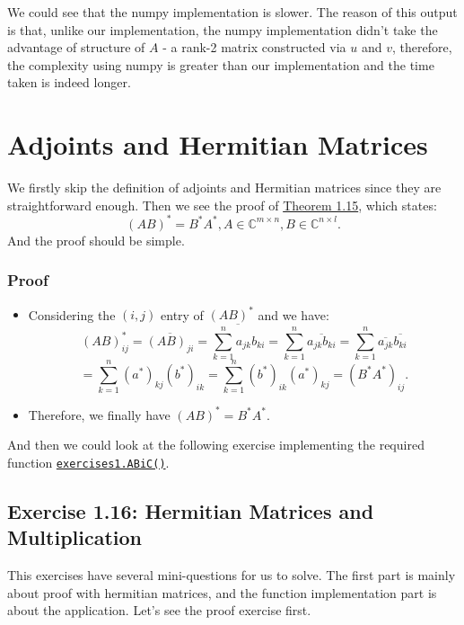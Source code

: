 \noindent We could see that the numpy implementation is slower. The reason of this output is that, unlike our implementation, the numpy implementation didn't take the advantage of structure of \(A\) - a rank-2 matrix constructed via \(u\) and \(v\), therefore, the complexity using numpy is greater than our implementation and the time taken is indeed longer.

\section{Adjoints and Hermitian Matrices}%

We firstly skip the definition of adjoints and Hermitian matrices since they are straightforward enough. Then we see the proof of \href{https://comp-lin-alg.github.io/L1_preliminaries.html#adjoints-and-hermitian-matrices}{Theorem 1.15}, which states:
\[ 
  (AB)^{*} = B^{*}A^{*}, A \in \mathbb{C}^{m \times n}, B \in \mathbb{C}^{n \times l}
.\] 
And the proof should be simple.
\subsubsection*{Proof}
\begin{itemize}
  \item Considering the $(i, j)$ entry of $(AB)^{*}$ and we have:
    \[
      (AB)^{*}_{ij} = \overline{(AB)_{ji}}=\overline{\sum_{k=1}^{n} a_{jk}b_{ki}} = \sum_{k=1}^{n} \overline{a_{jk}b_{ki}} = \sum_{k=1}^{n} \overline{a_{jk}}\overline{b_{ki}}
    \]
    \[
      = \sum_{k=1}^{n} (a^{*})_{kj} (b^{*})_{ik} = \sum_{k=1}^{n} (b^{*})_{ik} (a^{*})_{kj} = (B^{*}A^{*})_{ij}
    .\]
  \item Therefore, we finally have $(AB)^{*} = B^{*}A^{*}$.
\end{itemize}
And then we could look at the following exercise implementing the required function \href{https://comp-lin-alg.github.io/cla_utils.html#cla_utils.exercises1.ABiC}{\texttt{exercises1.ABiC()}}.
\subsection*{Exercise 1.16: Hermitian Matrices and Multiplication}%
This exercises have several mini-questions for us to solve. The first part is mainly about proof with hermitian matrices, and the function implementation part is about the application. Let's see the proof exercise first.

